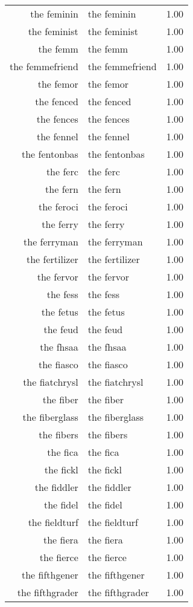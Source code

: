 \begin{table}[ht]
\begin{tabular}{rlr}
  the feminin & the feminin & 1.00 \\ 
  the feminist & the feminist & 1.00 \\ 
  the femm & the femm & 1.00 \\ 
  the femmefriend & the femmefriend & 1.00 \\ 
  the femor & the femor & 1.00 \\ 
  the fenced & the fenced & 1.00 \\ 
  the fences & the fences & 1.00 \\ 
  the fennel & the fennel & 1.00 \\ 
  the fentonbas & the fentonbas & 1.00 \\ 
  the ferc & the ferc & 1.00 \\ 
  the fern & the fern & 1.00 \\ 
  the feroci & the feroci & 1.00 \\ 
  the ferry & the ferry & 1.00 \\ 
  the ferryman & the ferryman & 1.00 \\ 
  the fertilizer & the fertilizer & 1.00 \\ 
  the fervor & the fervor & 1.00 \\ 
  the fess & the fess & 1.00 \\ 
  the fetus & the fetus & 1.00 \\ 
  the feud & the feud & 1.00 \\ 
  the fhsaa & the fhsaa & 1.00 \\ 
  the fiasco & the fiasco & 1.00 \\ 
  the fiatchrysl & the fiatchrysl & 1.00 \\ 
  the fiber & the fiber & 1.00 \\ 
  the fiberglass & the fiberglass & 1.00 \\ 
  the fibers & the fibers & 1.00 \\ 
  the fica & the fica & 1.00 \\ 
  the fickl & the fickl & 1.00 \\ 
  the fiddler & the fiddler & 1.00 \\ 
  the fidel & the fidel & 1.00 \\ 
  the fieldturf & the fieldturf & 1.00 \\ 
  the fiera & the fiera & 1.00 \\ 
  the fierce & the fierce & 1.00 \\ 
  the fifthgener & the fifthgener & 1.00 \\ 
  the fifthgrader & the fifthgrader & 1.00 \\ 

\end{tabular}
\end{table}
